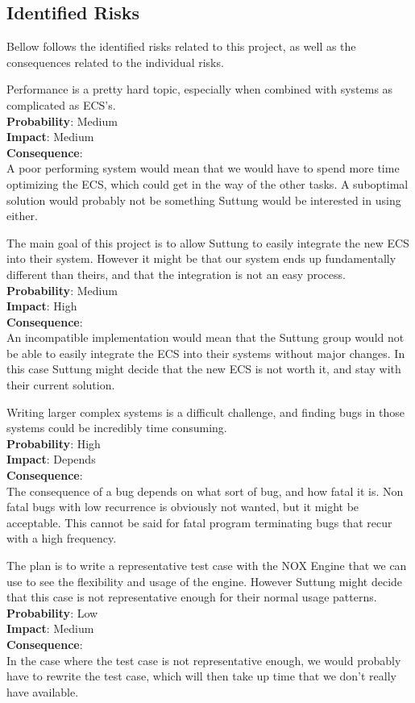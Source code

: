 \subsection{Identified Risks}
Bellow follows the identified risks related to this project, 
as well as the consequences related to the individual risks.

Performance is a pretty hard topic, especially when combined with
systems as complicated as ECS's.\\
\textbf{Probability}: Medium\\
\textbf{Impact}: Medium\\
\textbf{Consequence}:\\
A poor performing system would mean that we would have to spend more time
optimizing the ECS, which could get in the way of the other tasks.
A suboptimal solution would probably not be something Suttung would be interested
in using either.

The main goal of this project is to allow Suttung to easily integrate the new ECS
into their system. 
However it might be that our system ends up fundamentally different than theirs,
and that the integration is not an easy process.\\
\textbf{Probability}: Medium\\
\textbf{Impact}: High\\
\textbf{Consequence}:\\ 
An incompatible implementation would mean that the Suttung group would not be able to
easily integrate the ECS into their systems without major changes. 
In this case Suttung might decide that the new ECS is not worth it,
and stay with their current solution.

Writing larger complex systems is a difficult challenge, and finding bugs in those systems could be incredibly time consuming.\\
\textbf{Probability}: High\\
\textbf{Impact}: Depends\\
\textbf{Consequence}:\\
The consequence of a bug depends on what sort of bug, 
and how fatal it is. Non fatal bugs with low recurrence is obviously not wanted,
but it might be acceptable. This cannot be said for fatal program terminating bugs
that recur with a high frequency.

The plan is to write a representative test case with the NOX Engine that we can use
to see the flexibility and usage of the engine. However Suttung might decide that this
case is not representative enough for their normal usage patterns.\\
\textbf{Probability}: Low\\
\textbf{Impact}: Medium\\
\textbf{Consequence}:\\
In the case where the test case is not representative enough, we would probably have to
rewrite the test case, which will then take up time that we don't really have available.

